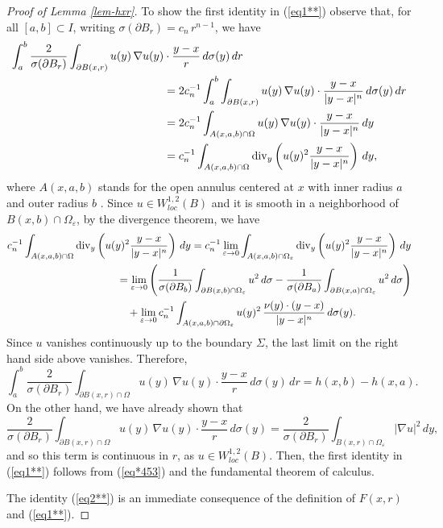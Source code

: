 \documentclass[11pt]{amsart}
\newcommand{\rf}[1]{{(\ref{#1})}}
\newcommand{\ve}{{\varepsilon}}
\theoremstyle{definition}
\theoremstyle{remark}
\numberwithin{equation}{section}
\begin{document}
\begin{proof}[Proof of Lemma \ref{lem-hxr}]
To show the first identity in \rf{eq1**} observe that,
for all $[a,b]\subset I$, writing $\sigma(\partial B_r)=c_n\,r^{n-1}$,  we have
\begin{align*}
\int_a^b\frac2{\sigma(\partial B_r)} \int_{\partial B(x,r)} u(y)\,\nabla u(y)&\cdot \frac{y-x}r\,d\sigma(y)\,dr\\ & = 2c_n^{-1}\int_a^b \int_{\partial B(x,r)} u(y)\,\nabla u(y)\cdot \frac{y-x}{|y-x|^{n}}\,d\sigma(y)\,dr\\
& = 2c_n^{-1} \int_{A(x,a,b)\cap\Omega} u(y)\,\nabla u(y)\cdot \frac{y-x}{|y-x|^{n}}\,dy\\
& = c_n^{-1} \int_{A(x,a,b)\cap\Omega} {\rm div}_y\left(u(y)^2\frac{y-x}{|y-x|^{n}}\right)\,dy,
\end{align*}
where $A(x,a,b)$ stands for the open annulus centered at $x$ with inner radius $a$ and
outer radius $b$ .
Since $u\in W^{1,2}_{loc}(B)$ and it is smooth in a neighborhood of $B(x,b)\cap \Omega_\ve$, by the divergence theorem, we have
\begin{align*}
c_n^{-1}\int_{A(x,a,b)\cap\Omega} {\rm div}_y&\left(u(y)^2\frac{y-x}{|y-x|^{n}}\right)\,dy 
=c_n^{-1}\lim_{\ve\to0}\int_{A(x,a,b)\cap\Omega_\ve} 
{\rm div}_y\left(u(y)^2\frac{y-x}{|y-x|^{n}}\right)\,dy\\
& \qquad= \lim_{\ve\to0}\left(\frac1{\sigma(\partial B_b)}\int_{\partial B(x,b)\cap\Omega_\ve} u^2\,d\sigma
- \frac1{\sigma(\partial B_a)}\int_{\partial B(x,a)\cap\Omega_\ve} u^2\,d\sigma\right)\\
& \qquad\quad + \lim_{\ve\to0} c_n^{-1} \int_{A(x,a,b)\cap\partial\Omega_\ve} 
u(y)^2\,\frac{\nu(y)\cdot(y-x)}{|y-x|^n}\,d\sigma(y).
\end{align*}
Since $u$ vanishes continuously up to the boundary $\Sigma$, the last limit on the right hand side above vanishes.
Therefore,
\begin{equation}\label{eq*453}
\int_a^b\frac2{\sigma(\partial B_r)} \int_{\partial B(x,r)\cap\Omega} u(y)\,\nabla u(y)\cdot \frac{y-x}r\,d\sigma(y)\,dr = h(x,b)- h(x,a).
\end{equation}
On the other hand, we have already shown that
$$\frac2{\sigma(\partial B_r)} \int_{\partial B(x,r)\cap\Omega} u(y)\,\nabla u(y)\cdot \frac{y-x}r\,d\sigma(y)=\frac2{\sigma(\partial B_r)} \int_{B(x,r)\cap \Omega_\ve} |\nabla u|^2\,dy,$$
and so this term is continuous in $r$, as $u\in W^{1,2}_{loc}(B)$.
Then, the first identity in \rf{eq1**} follows from \rf{eq*453} and the fundamental theorem of calculus.

The identity \rf{eq2**} is an immediate consequence of the definition of $F(x,r)$ and \rf{eq1**}. 
\end{proof}
\end{document}
